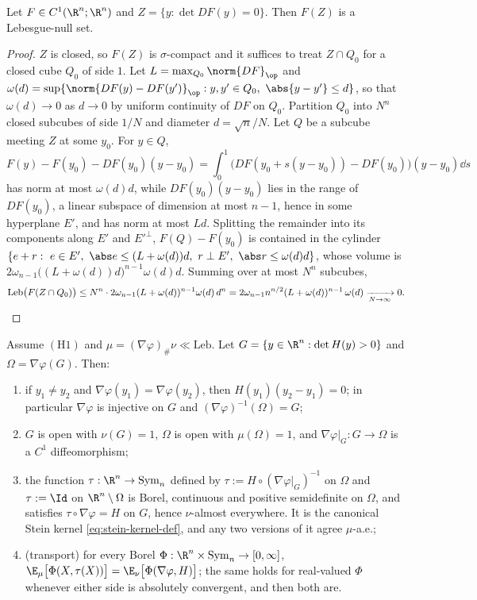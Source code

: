 \documentclass[../main.tex]{subfiles}
\begin{document}
\begin{lemma}
\label{lem:sol-lstm-sard}
Let $F\in C^1(\R^n;\R^n)$ and $Z=\{y:\det DF(y)=0\}$.  Then $F(Z)$ is a Lebesgue-null set.
\end{lemma}

\begin{proof}
$Z$ is closed, so $F(Z)$ is $\sigma$-compact and it suffices to treat $Z\cap Q_0$ for a closed
cube $Q_0$ of side $1$.  Let $L=\max_{Q_0}\norm{DF}_{\op}$ and
$\omega(d)=\sup\{\norm{DF(y)-DF(y')}_{\op}:y,y'\in Q_0,\ \abs{y-y'}\le d\}$, so that
$\omega(d)\to0$ as $d\to0$ by uniform continuity of $DF$ on $Q_0$.  Partition $Q_0$ into
$N^n$ closed subcubes of side $1/N$ and diameter $d=\sqrt n/N$.  Let $Q$ be a subcube meeting
$Z$ at some $y_0$.  For $y\in Q$,
\[
  F(y)-F(y_0)-DF(y_0)(y-y_0)=\int_0^1\bigl(DF(y_0+s(y-y_0))-DF(y_0)\bigr)(y-y_0)\dd s
\]
has norm at most $\omega(d)d$, while $DF(y_0)(y-y_0)$ lies in the range of $DF(y_0)$, a
linear subspace of dimension at most $n-1$, hence in some hyperplane $E'$, and has norm at
most $Ld$.  Splitting the remainder into its components along $E'$ and $E'^{\perp}$,
$F(Q)-F(y_0)$ is contained in the cylinder
$\{e+r:\ e\in E',\ \abs e\le(L+\omega(d))d,\ r\perp E',\ \abs r\le\omega(d)d\}$, whose
volume is $2\omega_{n-1}\bigl((L+\omega(d))d\bigr)^{n-1}\omega(d)d$.  Summing over at most
$N^n$ subcubes,
\[
  \mathrm{Leb}\bigl(F(Z\cap Q_0)\bigr)\le N^n\cdot2\omega_{n-1}(L+\omega(d))^{n-1}\omega(d)\,d^n
  =2\omega_{n-1}n^{n/2}(L+\omega(d))^{n-1}\,\omega(d)\xrightarrow[N\to\infty]{}0 .\qedhere
\]
\end{proof}

\begin{lemma}
\label{lem:sol-lstm-structure}
Assume $(\mathrm H1)$ and $\mu=(\nabla\varphi)_\#\nu\ll\mathrm{Leb}$.  Let
$G=\{y\in\R^n:\det H(y)>0\}$ and $\Omega=\nabla\varphi(G)$.  Then:
\begin{enumerate}
\item[(i)] if $y_1\ne y_2$ and $\nabla\varphi(y_1)=\nabla\varphi(y_2)$, then
  $H(y_1)(y_2-y_1)=0$; in particular $\nabla\varphi$ is injective on $G$ and
  $(\nabla\varphi)^{-1}(\Omega)=G$;
\item[(ii)] $G$ is open with $\nu(G)=1$, $\Omega$ is open with $\mu(\Omega)=1$, and
  $\nabla\varphi|_G:G\to\Omega$ is a $C^1$ diffeomorphism;
\item[(iii)] the function $\tau:\R^n\to\mathrm{Sym}_n$ defined by
  $\tau:=H\circ(\nabla\varphi|_G)^{-1}$ on $\Omega$ and $\tau:=\Id$ on $\R^n\setminus\Omega$
  is Borel, continuous and positive semidefinite on $\Omega$, and satisfies
  $\tau\circ\nabla\varphi=H$ on $G$, hence $\nu$-almost everywhere.  It is the canonical
  Stein kernel \eqref{eq:stein-kernel-def}, and any two versions of it agree $\mu$-a.e.;
\item[(iv)] (transport) for every Borel $\Phi:\R^n\times\mathrm{Sym}_n\to[0,\infty]$,
  $\E_\mu\bigl[\Phi(X,\tau(X))\bigr]=\E_\nu\bigl[\Phi(\nabla\varphi,H)\bigr]$; the same holds
  for real-valued $\Phi$ whenever either side is absolutely convergent, and then both are.
\end{enumerate}
\end{lemma}
\end{document}
